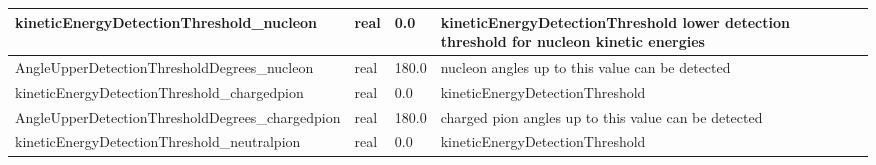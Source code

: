 \documentclass{article}
\begin{document}
\begin{longtable}{llll}
\midrule
kineticEnergyDetectionThreshold\_nucleon & \begin{minipage}[t]{2cm}real\end{minipage} & \begin{minipage}[t]{2cm}0.0\end{minipage} & \begin{minipage}[t]{12cm}kineticEnergyDetectionThreshold lower detection threshold for nucleon kinetic energies\end{minipage}\\*
\midrule
AngleUpperDetectionThresholdDegrees\_nucleon & \begin{minipage}[t]{2cm}real\end{minipage} & \begin{minipage}[t]{2cm}180.0\end{minipage} & \begin{minipage}[t]{12cm}nucleon angles up to this value can be detected\end{minipage}\\*
\midrule
kineticEnergyDetectionThreshold\_chargedpion & \begin{minipage}[t]{2cm}real\end{minipage} & \begin{minipage}[t]{2cm}0.0\end{minipage} & \begin{minipage}[t]{12cm}kineticEnergyDetectionThreshold\end{minipage}\\*
\midrule
AngleUpperDetectionThresholdDegrees\_chargedpion & \begin{minipage}[t]{2cm}real\end{minipage} & \begin{minipage}[t]{2cm}180.0\end{minipage} & \begin{minipage}[t]{12cm}charged pion angles up to this value can be detected\end{minipage}\\*
\midrule
kineticEnergyDetectionThreshold\_neutralpion & \begin{minipage}[t]{2cm}real\end{minipage} & \begin{minipage}[t]{2cm}0.0\end{minipage} & \begin{minipage}[t]{12cm}kineticEnergyDetectionThreshold\end{minipage}\\*
\midrule

\end{longtable}
\end{document}
